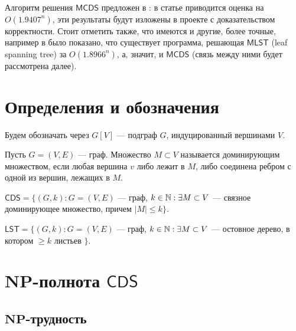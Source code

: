 Алгоритм решения \(\mathsf{MCDS}\) предложен в \cite{fomin}: в статье приводится оценка на \(O(1.9407^n)\), эти результаты будут изложены в проекте с доказательством корректности. Стоит отметить также, что имеются и другие, более точные, например в \cite{fernau} было показано, что существует программа, решающая \(\mathsf{MLST}\) (leaf spanning tree) за \(O(1.8966^n)\), а, значит, и \(\mathsf{MCDS}\) (связь между ними будет рассмотрена далее).

\section{Определения и обозначения}

\begin{note}[Обозначение]
    Будем обозначать через \(G[V]\) --- подграф \(G\), индуцированный вершинами \(V\).
\end{note}

\begin{definition}
    Пусть \(G = (V, E)\) --- граф. Множество \(M \subset V\) называется доминирующим множеством, если любая вершина \(v\) либо лежит в \(M\), либо соединена ребром с одной из вершин, лежащих в \(M\).
\end{definition}

\begin{definition}
    \(\mathsf{CDS} = \{(G, k): G = (V, E)\) --- граф, \(k \in \mathbb{N}: \exists M \subset V\) --- связное доминирующее множество, причем \(|M| \le k\}\).
\end{definition}

\begin{definition}
    \(\mathsf{LST} = \{(G, k): G = (V, E)\) --- граф, \(k \in \mathbb{N}: \exists M \subset V\) --- остовное дерево, в котором \(\ge k\) листьев \(\}\).
\end{definition}

\section{\(\mathbf{NP}\)-полнота \(\mathsf{CDS}\)}

\subsection{\(\mathbf{NP}\)-трудность}

